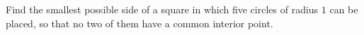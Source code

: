 Find the smallest possible side of a square in which five circles of radius $1$ can be placed, so that no two of them have a common interior point.
